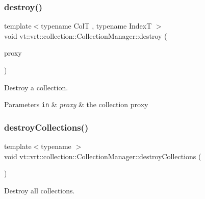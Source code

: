 \subsubsection{\texorpdfstring{destroy()}{destroy()}}
{\footnotesize\ttfamily template$<$typename ColT , typename IndexT $>$ \\
void vt\+::vrt\+::collection\+::\+Collection\+Manager\+::destroy (\begin{DoxyParamCaption}\item[{\hyperlink{structvt_1_1vrt_1_1collection_1_1_collection_manager_a56458ed7f9bb22b631b9b3a745f42f94}{Collection\+Proxy\+Wrap\+Type}$<$ ColT, IndexT $>$ const \&}]{proxy }\end{DoxyParamCaption})}



Destroy a collection. 


\begin{DoxyParams}[1]{Parameters}
\mbox{\tt in}  & {\em proxy} & the collection proxy \\
\hline
\end{DoxyParams}
\mbox{\label{structvt_1_1vrt_1_1collection_1_1_collection_manager_a71865b0508bab58b6d44b44416f11983}} 
\subsubsection{\texorpdfstring{destroy\+Collections()}{destroyCollections()}}
{\footnotesize\ttfamily template$<$typename $>$ \\
void vt\+::vrt\+::collection\+::\+Collection\+Manager\+::destroy\+Collections (\begin{DoxyParamCaption}{ }\end{DoxyParamCaption})}



Destroy all collections. 

\mbox{\label{structvt_1_1vrt_1_1collection_1_1_collection_manager_afac7551ce2ddeeff21631fa9e6987784}} 
